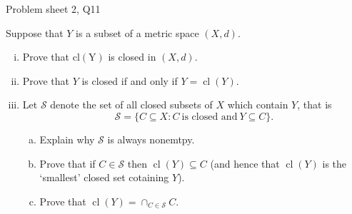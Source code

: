 \begin{problem}{Problem sheet 2, Q11}{}


    Suppose that $Y$ is a subset of a metric space $(X, d)$.

    \begin{enumerate}[i)]
        \item Prove that $\operatorname{cl(Y)}$ is closed in $(X, d)$.
        \item Prove that $Y$ is closed if and only if $Y = \operatorname{cl}(Y)$.
        \item Let $\mathcal{S}$ denote the set of all closed subsets of $X$ which contain $Y$, that is
            $$ \mathcal{S} = \{ C \subseteq X : C \
            \text{is closed and} \ Y \subseteq C \} . $$
        \begin{enumerate}[(a)]
            \item Explain why $\mathcal{S}$ is always nonemtpy.
            \item Prove that if $C \in \mathcal{S}$ then $\operatorname{cl}(Y) \subseteq C$ (and hence that $\operatorname{cl}(Y)$ is the `smallest' closed set cotaining $Y$).
            \item Prove that $\operatorname{cl}(Y) = \cap_{C \in \mathcal{S}} C$.
        \end{enumerate}
    \end{enumerate}

    \tcblower


\end{problem}
